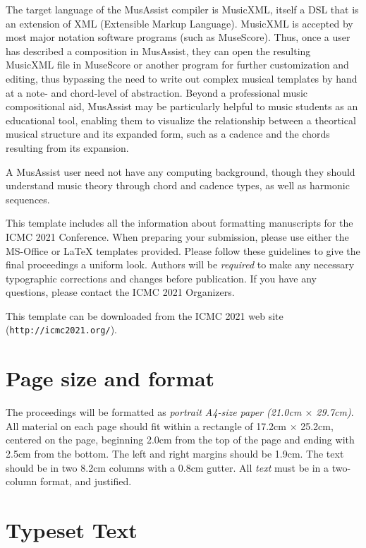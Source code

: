 \documentclass{article}
\begin{document}
The target language of the MusAssist compiler is MusicXML, itself a DSL that is an extension of
XML (Extensible Markup Language). MusicXML is accepted by most major notation software programs (such as MuseScore). 
Thus, once a user has described a composition in MusAssist, they can open the resulting MusicXML file in MuseScore or another
program for further customization and editing, thus bypassing the need to write out complex musical templates by hand at a 
note- and chord-level of abstraction. Beyond a professional music compositional aid, MusAssist may be particularly 
helpful to music students as an educational tool, enabling them to visualize the relationship between a theortical musical structure 
and its expanded form, such as a cadence and the chords resulting from its expansion.

A MusAssist user need not have any computing background, though they should understand
music theory through chord and cadence types, as well as harmonic sequences.

This template includes all the information about formatting manuscripts for the ICMC 2021 Conference. When preparing your submission, please use either the MS-Office or LaTeX templates provided. Please follow these guidelines to give the final proceedings a uniform look. Authors will be {\em required} to make any necessary typographic corrections and changes before publication. If you have any questions, please contact the ICMC 2021 Organizers.

This template can be downloaded from the ICMC 2021 web site (\texttt{http://icmc2021.org/}).

\section{Page size and format}\label{sec:page_size}
The proceedings will be formatted as {\em portrait A4-size paper (21.0cm $\times$ 29.7cm)}. All material on each page should fit within a rectangle of 17.2cm $\times$ 25.2cm, centered on the page, beginning 2.0cm from the top of the page and ending with 2.5cm from the bottom. The left and right margins should be 1.9cm. The text should be in two 8.2cm columns with a 0.8cm gutter. All {\em text} must be in a two-column format, and justified.

\section{Typeset Text}\label{sec:typeset_text}
\end{document}
